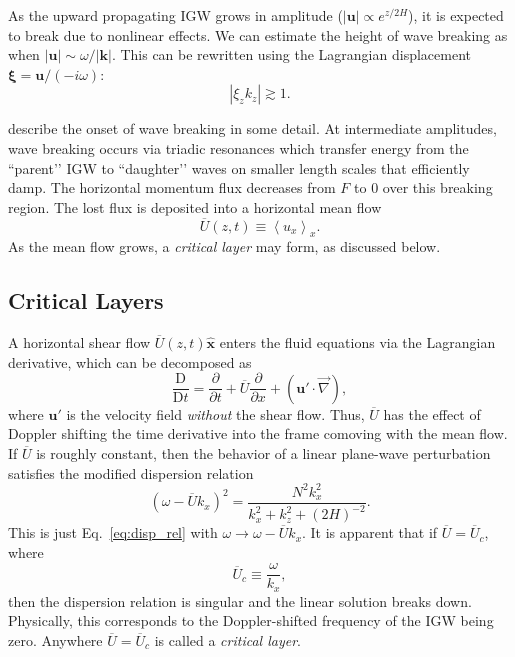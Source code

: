 \documentclass[
        fleqn,
        usenatbib,
        referee,
    ]{mnras}
\newcommand*{\pd}[2]{\frac{\partial#1}{\partial#2}}
\newcommand*{\md}[2]{\frac{\mathrm{D}#1}{\mathrm{D}#2}}
\newcommand*{\abs}[1]{\left|#1\right|}
\newcommand*{\ev}[1]{\left\langle#1\right\rangle}
\newcommand*{\p}[1]{\left(#1\right)}
\newcommand*{\bm}[1]{\mathbf{#1}}
\newcommand*{\uv}[1]{\hat{\mathbf{#1}}}
\begin{document}
As the upward propagating IGW grows in amplitude ($\abs{\bm{u}} \propto
e^{z/2H}$), it is expected to break due to nonlinear effects. We can estimate
the height of wave breaking as when $\abs{\bm{u}} \sim \omega / \abs{\bm{k}}$.
This can be rewritten using the Lagrangian displacement $\bm{\xi} = \bm{u} /
\p{-i\omega}$:
\begin{equation}
    \abs{\xi_z k_z} \gtrsim 1.\label{eq:nl}
\end{equation}

\citet{drazin, klostermeyer, winters1994} describe the onset of wave breaking in
some detail. At intermediate amplitudes, wave breaking occurs via triadic
resonances which transfer energy from the ``parent’’ IGW to ``daughter’’ waves
on smaller length scales that efficiently damp. The horizontal momentum flux
decreases from $F$ to $0$ over this breaking region. The lost flux is deposited
into a horizontal mean flow
\begin{equation}
    \overline{U}(z, t) \equiv \ev{u_x}_x.\label{eq:mean_flow}
\end{equation}
As the mean flow grows, a \emph{critical layer} may form, as discussed below.

\subsection{Critical Layers}\label{ss:crit_layer}

A horizontal shear flow $\overline{U}(z, t)\uv{x}$ enters the fluid equations
via the Lagrangian derivative, which can be decomposed as
\begin{equation}
    \md{}{t} = \pd{}{t} + \overline{U} \pd{}{x} + \p{\bm{u}' \cdot \vec{\nabla}},
\end{equation}
where $\bm{u}'$ is the velocity field \emph{without} the shear flow. Thus,
$\overline{U}$ has the effect of Doppler shifting the time derivative into the
frame comoving with the mean flow. If $\overline{U}$ is roughly constant, then
the behavior of a linear plane-wave perturbation satisfies the modified
dispersion relation
\begin{equation}
    \p{\omega - \overline{U}k_x}^2 =
        \frac{N^2k_{x}^2}{k_{x}^2 + k_{z}^2 + \p{2H}^{-2}}.
        \label{eq:disp_rel_U}
\end{equation}
This is just Eq.~\eqref{eq:disp_rel} with $\omega \to \omega - \overline{U}
k_x$. It is apparent that if $\overline{U} = \overline{U}_c$, where
\begin{equation}
    \overline{U}_c \equiv \frac{\omega}{k_x},\label{eq:u_crit}
\end{equation}
then the dispersion relation is singular and the linear solution breaks down.
Physically, this corresponds to the Doppler-shifted frequency of the IGW being
zero. Anywhere $\overline{U} = \overline{U}_c$ is called a \emph{critical
layer}.
\end{document}
